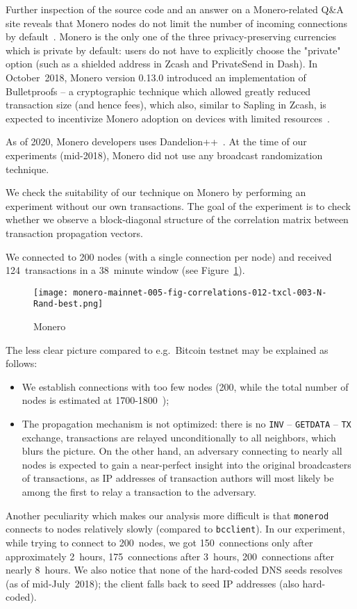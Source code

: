 Further inspection of the source code and an answer on a Monero-related Q\&A site reveals that Monero nodes do not limit the number of incoming connections by default~\cite{user363032016}.
Monero is the only one of the three privacy-preserving currencies which is private by default: users do not have to explicitly choose the "private" option (such as a shielded address in Zcash and PrivateSend in Dash).
In October~2018, Monero version 0.13.0 introduced an implementation of Bulletproofs -- a cryptographic technique which allowed greatly reduced transaction size (and hence fees), which also, similar to Sapling in Zcash, is expected to incentivize Monero adoption on devices with limited resources~\cite{Spagni2018}.

As of 2020, Monero developers uses Dandelion++~\cite{ErCiccione2020}.
At the time of our experiments (mid-2018), Monero did not use any broadcast randomization technique.

We check the suitability of our technique on Monero by performing an experiment without our own transactions.
The goal of the experiment is to check whether we observe a block-diagonal structure of the correlation matrix between transaction propagation vectors.

We connected to 200 nodes (with a single connection per node) and received 124~transactions in a 38~minute window (see Figure~\ref{fig:monero}).

\begin{figure}[!t]
	\centering
	\texttt{[image: monero-mainnet-005-fig-correlations-012-txcl-003-N-Rand-best.png]}
	\caption{Monero}
	\label{fig:monero}
\end{figure}

The less clear picture compared to e.g.~Bitcoin testnet may be explained as follows:
\begin{itemize}
	\item We establish connections with too few nodes (200, while the total number of nodes is estimated at 1700-1800~\cite{MoneroHash});
	\item The propagation mechanism is not optimized: there is no \texttt{INV} -- \texttt{GETDATA} -- \texttt{TX} exchange, transactions are relayed unconditionally to all neighbors, which blurs the picture. On the other hand, an adversary connecting to nearly all nodes is expected to gain a near-perfect insight into the original broadcasters of transactions, as IP addresses of transaction authors will most likely be among the first to relay a transaction to the adversary.
\end{itemize}
Another peculiarity which makes our analysis more difficult is that \texttt{monerod} connects to nodes relatively slowly (compared to \texttt{bcclient}).
In our experiment, while trying to connect to 200~nodes, we got 150~connections only after approximately 2~hours, 175~connections after 3~hours, 200~connections after nearly 8~hours.
We also notice that none of the hard-coded DNS seeds resolves (as of mid-July~2018); the client falls back to seed IP addresses (also hard-coded).


